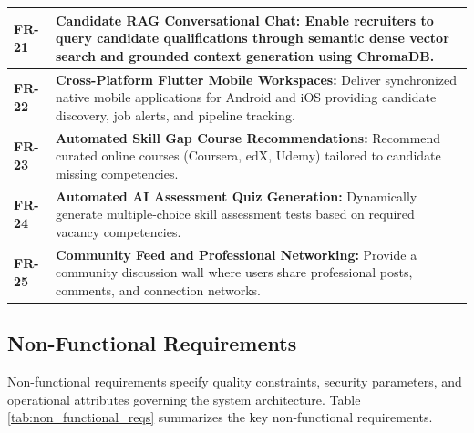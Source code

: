 \begin{table}[h!]
\begin{tabular}{|l|p{12cm}|}
\textbf{FR-21} & \textbf{Candidate RAG Conversational Chat:} Enable recruiters to query candidate qualifications through semantic dense vector search and grounded context generation using ChromaDB. \\ \hline
\textbf{FR-22} & \textbf{Cross-Platform Flutter Mobile Workspaces:} Deliver synchronized native mobile applications for Android and iOS providing candidate discovery, job alerts, and pipeline tracking. \\ \hline
\textbf{FR-23} & \textbf{Automated Skill Gap Course Recommendations:} Recommend curated online courses (Coursera, edX, Udemy) tailored to candidate missing competencies. \\ \hline
\textbf{FR-24} & \textbf{Automated AI Assessment Quiz Generation:} Dynamically generate multiple-choice skill assessment tests based on required vacancy competencies. \\ \hline
\textbf{FR-25} & \textbf{Community Feed and Professional Networking:} Provide a community discussion wall where users share professional posts, comments, and connection networks. \\ \hline
\end{tabular}
\end{table}

\subsection{Non-Functional Requirements}
Non-functional requirements specify quality constraints, security parameters, and operational attributes governing the system architecture. Table \ref{tab:non_functional_reqs} summarizes the key non-functional requirements.

